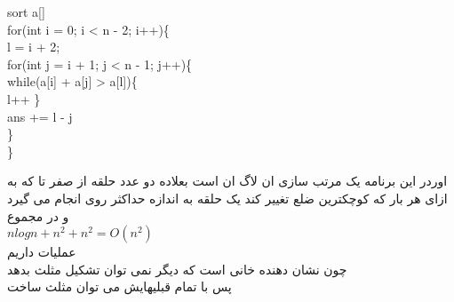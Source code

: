 \documentclass[a4paper]{article}
\begin{document}
\begin{latin}
sort a[]\\
for(int i = 0; i < n - 2; i++)\{\\
l = i + 2;\\
for(int j = i + 1; j < n - 1; j++)\{\\
while(a[i] + a[j] > a[l])\{\\
l++
\}\\
ans += l - j\\
\}\\
\}\\
\end{latin}

اوردر این برنامه یک مرتب سازی ان لاگ ان است بعلاده دو عدد حلقه از صفر تا 
که به ازای هر بار که کوچکترین ضلع تغییر کند یک حلقه به اندازه حداکثر
روی
انجام می گیرد و در مجموع\\
$nlogn + n^2 + n^2 = O(n^2)$\\
عملیات داریم\\
چون 
نشان دهنده خانی است که دیگر نمی توان تشکیل مثلث بدهد\\
پس با تمام قبلیهایش می توان مثلث ساخت
\newpage
\end{document}
